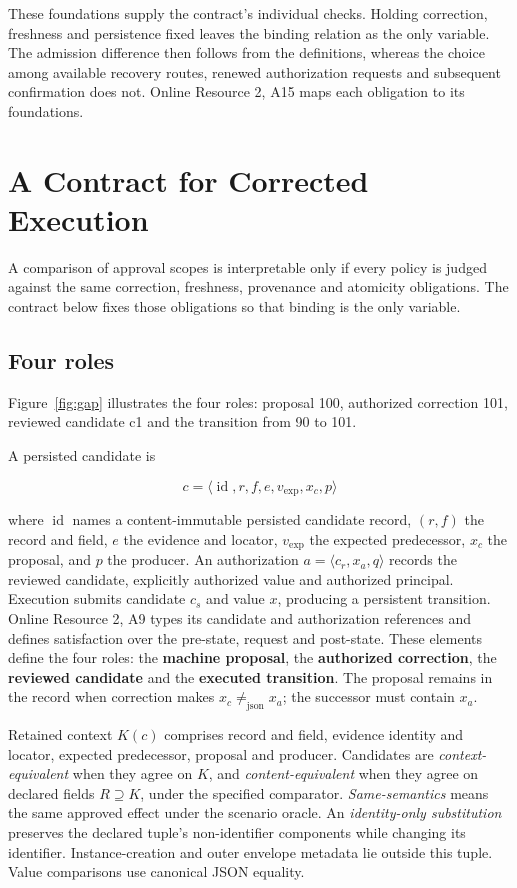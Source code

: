 \documentclass[pdflatex,sn-basic]{sn-jnl}
\begin{document}
These foundations supply the contract's individual checks. Holding correction, freshness and persistence fixed leaves the binding relation as the only variable. The admission difference then follows from the definitions, whereas the choice among available recovery routes, renewed authorization requests and subsequent confirmation does not. Online Resource 2, A15 maps each obligation to its foundations.

\section{A Contract for Corrected Execution}\label{a-contract-for-corrected-execution}

A comparison of approval scopes is interpretable only if every policy is judged against the same correction, freshness, provenance and atomicity obligations. The contract below fixes those obligations so that binding is the only variable.

\subsection{Four roles}\label{four-roles}

Figure~\ref{fig:gap} illustrates the four roles: proposal 100, authorized correction 101, reviewed candidate c1 and the transition from 90 to 101.

A persisted candidate is

\[
c = \langle \operatorname{id}, r, f, e, v_{\mathrm{exp}}, x_c, p\rangle
\]

where \(\operatorname{id}\) names a content-immutable persisted candidate record, \((r,f)\) the record and field, \(e\) the evidence and locator, \(v_{\mathrm{exp}}\) the expected predecessor, \(x_c\) the proposal, and \(p\) the producer. An authorization \(a = \langle c_r, x_a, q\rangle\) records the reviewed candidate, explicitly authorized value and authorized principal. Execution submits candidate \(c_s\) and value \(x\), producing a persistent transition. Online Resource 2, A9 types its candidate and authorization references and defines satisfaction over the pre-state, request and post-state. These elements define the four roles: the \textbf{machine proposal}, the \textbf{authorized correction}, the \textbf{reviewed candidate} and the \textbf{executed transition}. The proposal remains in the record when correction makes \(x_c \ne _{\mathrm{json}} x_a\); the successor must contain \(x_a\).

Retained context \(K(c)\) comprises record and field, evidence identity and locator, expected predecessor, proposal and producer. Candidates are \emph{context-equivalent} when they agree on \(K\), and \emph{content-equivalent} when they agree on declared fields \(R\supseteq K\), under the specified comparator. \emph{Same-semantics} means the same approved effect under the scenario oracle. An \emph{identity-only substitution} preserves the declared tuple's non-identifier components while changing its identifier. Instance-creation and outer envelope metadata lie outside this tuple. Value comparisons use canonical JSON equality.
\end{document}
